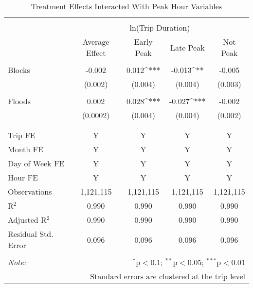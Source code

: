 \captionsetup{labelsep=newline}
\begin{table}[!htbp]
\centering

\caption{Treatment Effects Interacted With Peak Hour Variables}
\label{table:peak}

\begin{tabular}{l c c c c} 
\\[-1.8ex]\hline 
\hline \\[-1.8ex] 
 & \multicolumn{4}{c}{ln(Trip Duration)} \\
 & Average Effect & Early Peak & Late Peak & Not Peak\\
 \hline\\[-1.8ex] 
 Blocks  & -0.002 & 0.012^{***} & -0.013^{**} & -0.005\\ 
  & (0.002) & (0.004) & (0.004) & (0.003)\\ 
  & \\
 Floods & 0.002 & 0.028^{***} & -0.027^{***} & -0.002 \\ 
  & (0.0002) & (0.004) & (0.004) & (0.002)\\ 
\\[-1.8ex] \hline \\[-1.8ex] 
Trip FE & Y & Y & Y & Y\\
Month FE & Y & Y & Y & Y\\
Day of Week FE & Y & Y & Y & Y\\
Hour FE & Y & Y & Y & Y\\
Observations & \multicolumn{1}{c}{1,121,115} & \multicolumn{1}{c}{1,121,115} & \multicolumn{1}{c}{1,121,115} & \multicolumn{1}{c}{1,121,115} \\ 
R$^{2}$ & \multicolumn{1}{c}{0.990} & \multicolumn{1}{c}{0.990} & \multicolumn{1}{c}{0.990} & \multicolumn{1}{c}{0.990} \\ 
Adjusted R$^{2}$ & \multicolumn{1}{c}{0.990} & \multicolumn{1}{c}{0.990} & \multicolumn{1}{c}{0.990} & \multicolumn{1}{c}{0.990} \\ 
Residual Std. Error & \multicolumn{1}{c}{0.096} & \multicolumn{1}{c}{0.096} & \multicolumn{1}{c}{0.096} & \multicolumn{1}{c}{0.096} \\ 
\hline 
\hline \\[-1.8ex] 
\textit{Note:}  & \multicolumn{4}{r}{$^{*}$p$<$0.1; $^{**}$p$<$0.05; $^{***}$p$<$0.01} \\ 
 & \multicolumn{4}{r}{Standard errors are clustered at the trip level}\\
\end{tabular} 

\end{table}
